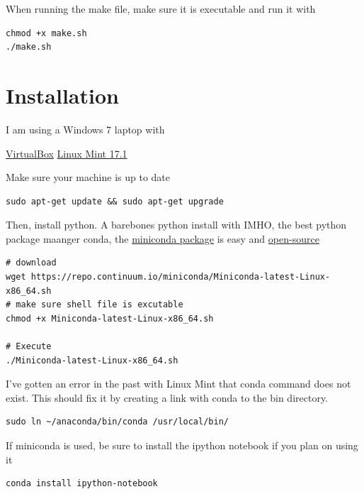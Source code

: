 \documentclass[%
twocolumn,
twoside,                 %
final,                   %
10pt]{article}
\begin{document}
When running the make file, make sure it is executable and run it with

\begin{verbatim}
chmod +x make.sh
./make.sh
\end{verbatim}

\section{Installation}
\label{sec:install}

I am using a Windows 7 laptop with 	

\href{{https://www.virtualbox.org/wiki/Downloads}}{VirtualBox}
\href{{http://www.linuxmint.com/edition.php?id=172}}{Linux Mint 17.1}

Make sure your machine is up to date
\begin{verbatim}
sudo apt-get update && sudo apt-get upgrade
\end{verbatim}

Then, install python. A barebones python install with IMHO, the best python package maanger conda, the \href{{http://conda.pydata.org/miniconda.html}}{miniconda package} is easy and \href{{https://github.com/conda/conda}}{open-source}
\begin{verbatim}
# download
wget https://repo.continuum.io/miniconda/Miniconda-latest-Linux-x86_64.sh
# make sure shell file is excutable
chmod +x Miniconda-latest-Linux-x86_64.sh  

# Execute
./Miniconda-latest-Linux-x86_64.sh  
\end{verbatim}

I've gotten an error in the past with Linux Mint that conda command does not exist. This should fix it by creating a link with conda to the bin directory. 
\begin{verbatim}
sudo ln ~/anaconda/bin/conda /usr/local/bin/
\end{verbatim}

If miniconda is used, be sure to install the ipython notebook if you plan on using it
\begin{verbatim}
conda install ipython-notebook
\end{verbatim}
\end{document}
